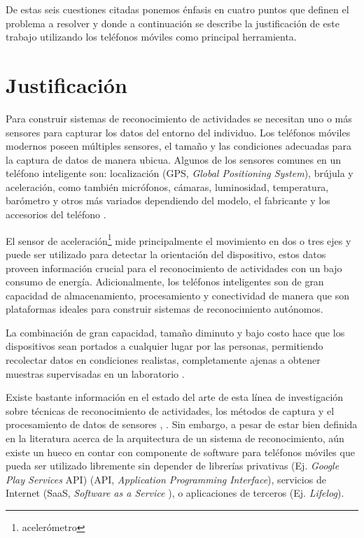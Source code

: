 De estas seis cuestiones citadas ponemos énfasis en cuatro puntos
que definen el problema a resolver y donde a continuación se describe
la justificación de este trabajo utilizando los teléfonos móviles
como principal herramienta.

\section{Justificación}

\label{justificaciuxf3n}

Para construir sistemas de reconocimiento de actividades se necesitan
uno o más sensores para capturar los datos del entorno del individuo.
Los teléfonos móviles modernos poseen múltiples sensores, el tamaño
y las condiciones adecuadas para la captura de datos de manera ubicua.
Algunos de los sensores comunes en un teléfono inteligente son: localización
(GPS,
\emph{Global Positioning System}), brújula y aceleración, como también
micrófonos, cámaras, luminosidad, temperatura, barómetro y otros más
variados dependiendo del modelo, el fabricante y los accesorios del
teléfono \cite{Kwapisz2011}.

El sensor de aceleración\footnote{acelerómetro} mide principalmente
el movimiento en dos o tres ejes y puede ser utilizado para detectar
la orientación del dispositivo, estos datos proveen información crucial
para el reconocimiento de actividades con un bajo consumo de energía.
Adicionalmente, los teléfonos inteligentes son de gran capacidad de
almacenamiento, procesamiento y conectividad de manera que son plataformas
ideales para construir sistemas de reconocimiento autónomos.

La combinación de gran capacidad, tamaño diminuto y bajo costo hace
que los dispositivos sean portados a cualquier lugar por las personas,
permitiendo recolectar datos en condiciones realistas, completamente
ajenas a obtener muestras supervisadas en un laboratorio \cite{Bao2004}. 

Existe bastante información en el estado del arte de esta línea de
investigación sobre técnicas de reconocimiento de actividades, los
métodos de captura y el procesamiento de datos de sensores \cite{LaraLabrador2012},
\cite{Kwapisz2011}. Sin embargo, a pesar de estar bien definida en
la literatura acerca de la arquitectura de un sistema de reconocimiento,
aún existe un hueco en contar con componente de software para teléfonos
móviles que pueda ser utilizado libremente sin depender de librerías
privativas (Ej. \emph{Google Play Services} API) (API,
\emph{Application Programming Interface}), servicios de Internet (SaaS,
\emph{Software as a Service} ), o aplicaciones de terceros (Ej. \emph{Lifelog}).

